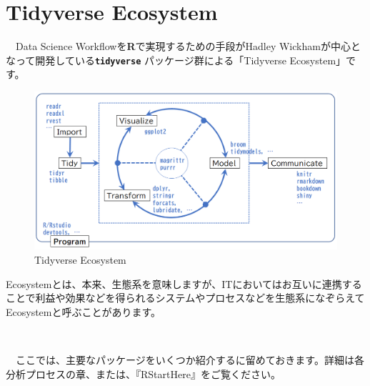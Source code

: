 \documentclass[
  12pt,
]{book}
\begin{document}
\newpage

\hypertarget{tidyverse-ecosystem}{%
\section*{Tidyverse Ecosystem}\label{tidyverse-ecosystem}}

　Data Science Workflowを\textbf{R}で実現するための手段がHadley Wickhamが中心となって開発している\textbf{\texttt{tidyverse}} パッケージ群による「Tidyverse Ecosystem」です。

\begin{figure}[H]

{\centering \includegraphics[width=0.9\linewidth,]{./fig/DSWF/tidyverse_eco_system} 

}

\caption{Tidyverse Ecosystem}\label{fig:unnamed-chunk-20}
\end{figure}

\begin{hint-box}
Ecosystemとは、本来、生態系を意味しますが、ITにおいてはお互いに連携することで利益や効果などを得られるシステムやプロセスなどを生態系になぞらえてEcosystemと呼ぶことがあります。
\end{hint-box}

　

　ここでは、主要なパッケージをいくつか紹介するに留めておきます。詳細は各分析プロセスの章、または、『RStartHere』\citep{RStartHere:GitHub}をご覧ください。
\end{document}
